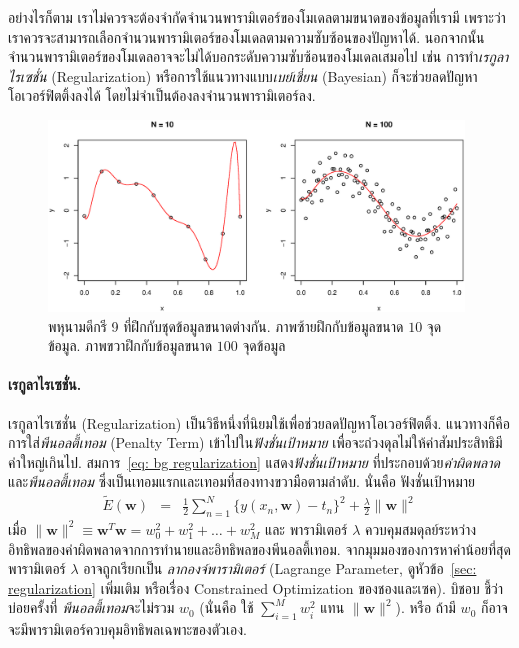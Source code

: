 อย่างไรก็ตาม เราไม่ควรจะต้องจำกัดจำนวนพารามิเตอร์ของโมเดลตามขนาดของข้อมูลที่เรามี 
เพราะว่า เราควรจะสามารถเลือกจำนวนพารามิเตอร์ของโมเดลตามความซับซ้อนของปัญหาได้. 
%
นอกจากนั้น จำนวนพารามิเตอร์ของโมเดลอาจจะไม่ได้บอกระดับความซับซ้อนของโมเดลเสมอไป 
เช่น การทำ\textit{เรกูลาไรเซชั่น} (Regularization) 
หรือการใช้แนวทางแบบ\textit{เบย์เชี่ยน} (Bayesian) 
ก็จะช่วยลดปัญหาโอเวอร์ฟิตติ้งลงได้ โดยไม่จำเป็นต้องลงจำนวนพารามิเตอร์ลง.

%
\begin{figure}
\begin{center}
\includegraphics[height=2in]{02Background/bgPolyM9DataSizes.eps}
\end{center}
\caption{พหุนามดีกรี 9 ที่ฝึกกับชุดข้อมูลขนาดต่างกัน.
ภาพซ้ายฝึกกับข้อมูลขนาด $10$ จุดข้อมูล.
ภาพขวาฝึกกับข้อมูลขนาด $100$ จุดข้อมูล}
\label{fig: bg poly M9 different data sizes}
\end{figure}
%

\paragraph{เรกูลาไรเซชั่น.}
เรกูลาไรเซชั่น (Regularization)   
เป็นวิธีหนึ่งที่นิยมใช้เพื่อช่วยลดปัญหาโอเวอร์ฟิตติ้ง.
แนวทางก็คือ การใส่\textit{พีนอลตี้เทอม} (Penalty Term) เข้าไปใน\textit{ฟังชั่นเป้าหมาย}
เพื่อจะถ่วงดุลไม่ให้ค่าสัมประสิทธิมีค่าใหญ่เกินไป.
สมการ~\ref{eq: bg regularization} แสดง\textit{ฟังชั่นเป้าหมาย}
ที่ประกอบด้วย\textit{ค่าผิดพลาด}และ\textit{พีนอลตี้เทอม} 
ซึ่งเป็นเทอมแรกและเทอมที่สองทางขวามือตามลำดับ.
%
นั่นคือ ฟังชั่นเป้าหมาย
\begin{eqnarray}
   \tilde{E}(\mathbf{w}) &=& \frac{1}{2} \sum_{n=1}^N \{ y(x_n, \mathbf{w}) - t_n \}^2 + \frac{\lambda}{2} \| \mathbf{w} \|^2
\label{eq: bg regularization}
\end{eqnarray}
เมื่อ $\| \mathbf{w} \|^2 \equiv \mathbf{w}^T \mathbf{w} = w_0^2 + w_1^2 + \ldots + w_M^2$ และ พารามิเตอร์ $\lambda$ ควบคุมสมดุลย์ระหว่างอิทธิพลของค่าผิดพลาดจากการทำนายและอิทธิพลของพีนอลตี้เทอม.
%
จากมุมมองของการหาค่าน้อยที่สุด 
พารามิเตอร์ $\lambda$ อาจถูกเรียกเป็น \textit{ลากองจ์พารามิเตอร์} 
(Lagrange Parameter, ดูหัวข้อ~\ref{sec: regularization} เพิ่มเติม หรือเรื่อง Constrained Optimization ของชองและเซค\cite{ChongZak2ndEd}).
%
บิชอบ\cite{Bishop2006a} ชี้ว่า บ่อยครั้งที่ \textit{พีนอลตี้เทอม}จะไม่รวม $w_0$ 
(นั่นคือ ใช้ $\sum_{i=1}^M w_i^2$ แทน $\| \mathbf{w} \|^2$).
หรือ ถ้ามี $w_0$ ก็อาจจะมีพารามิเตอร์ควบคุมอิทธิพลเฉพาะของตัวเอง.

